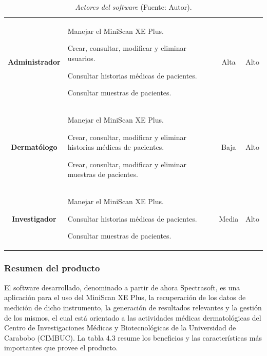 	\begin{table}[h]
		\small
		\caption[Actores del software]{\textit{Actores del software} (Fuente: Autor).}
		\centering
		\setlength{\extrarowheight}{\altocelda}
		\begin{tabulary}{\anchotabla}{|c|J|c|c|}
			\hline
			 &  &  & \\ \hline
			
			\textbf{Administrador} &
			
			Manejar el MiniScan XE Plus.
			
			Crear, consultar, modificar y eliminar usuarios.
			
			Consultar historias m\'{e}dicas de pacientes.
			
			Consultar muestras de pacientes. &
			Alta &
			Alto\\ \hline
			
			\textbf{Dermat\'{o}logo} &
			
			Manejar el MiniScan XE Plus.
			
			Crear, consultar, modificar y eliminar historias m\'{e}dicas de pacientes.
			
			Crear, consultar, modificar y eliminar muestras de pacientes. &
			Baja &
			Alto\\ \hline
			
			\textbf{Investigador} &
			
			Manejar el MiniScan XE Plus.
			
			Consultar historias m\'{e}dicas de pacientes.
			
			Consultar muestras de pacientes. &
			Media &
			Alto\\ \hline
		\end{tabulary}
	\end{table}
	
	\subsubsection{Resumen del producto}
	
	El software desarrollado, denominado a partir de ahora Spectrasoft, es una aplicaci\'{o}n para el uso del MiniScan XE Plus, la recuperaci\'{o}n de los datos de medici\'{o}n de dicho instrumento, la generaci\'{o}n de resultados relevantes y la gesti\'{o}n de los mismos, el cual est\'{a} orientado a las actividades m\'{e}dicas dermatol\'{o}gicas del Centro de Investigaciones M\'{e}dicas y Biotecnol\'{o}gicas de la Universidad de Carabobo (CIMBUC). La tabla 4.3 resume los beneficios y las caracter\'{i}sticas m\'{a}s importantes que provee el producto.
	
